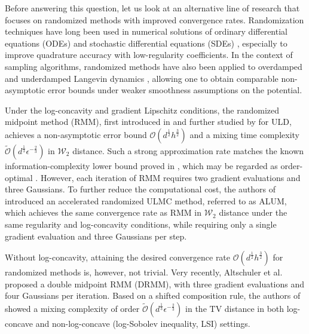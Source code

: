 \documentclass[12pt]{article}
\numberwithin{equation}{section}
\begin{document}
Before answering this question, let us look at an alternative line of research that focuses on randomized methods with improved convergence rates.
Randomization techniques have long been used in numerical solutions of ordinary differential equations (ODEs) \cite{heinrich2008randomized,jentzen2009random,stengle1995error} and stochastic differential equations (SDEs) \cite{kruse2017error,kruse2019randomized,bou2025randomized}, especially to improve quadrature accuracy with low-regularity coefficients. 
%
In the context of sampling algorithms, randomized methods have also been applied to overdamped and underdamped Langevin dynamics \cite{wang2025langevin,shen2019randomized,he2020ergodicity,yu2024langevin,altschuler2025shifted}, allowing one to obtain comparable non-asymptotic error bounds under weaker smoothness assumptions on the potential.

Under the log-concavity and gradient Lipschitz conditions, the randomized midpoint method (RMM), first introduced in \cite{shen2019randomized} and further studied by \cite{he2020ergodicity,yu2024langevin,altschuler2025shifted} for ULD, achieves a non-asymptotic error bound $\mathcal{O}(d^{\frac{1}{2}}h^{\frac{3}{2}})$ and a mixing time complexity $\widetilde{\mathcal{O}}(d^{\frac{1}{3}}\epsilon^{-\frac{2}{3}})$ in $\mathcal{W}_2$ distance. Such a strong approximation rate matches the known information-complexity lower bound proved in \cite{cao2020complexity}, which may be regarded as order-optimal \cite{cao2020complexity,sanz2021wasserstein,mou2021high}. However, each iteration of RMM requires two gradient evaluations and three Gaussians. 
To further reduce the computational cost, the authors of \cite{hu2021optimal} introduced an accelerated randomized ULMC method, referred to as ALUM, which achieves the same convergence rate as RMM in $\mathcal{W}_2$ distance under the same regularity and log-concavity conditions, while requiring only a single gradient evaluation and three Gaussians per step. 

Without log-concavity, attaining the desired convergence rate $\mathcal{O}(d^{\frac{1}{2}}h^{\frac{3}{2}})$ for randomized methods is, however, not trivial. %
Very recently, Altschuler et al. \cite{altschuler2025shifted} proposed a double midpoint RMM (DRMM), with three gradient evaluations and four Gaussians per iteration. Based on a shifted composition rule, the authors of \cite{altschuler2025shifted} showed a mixing complexity of order $\widetilde{\mathcal{O}}(d^{\frac{1}{3}}\epsilon^{-\frac{2}{3}})$ in the $\mathrm{TV}$ distance in both log-concave and non-log-concave  (log-Sobolev inequality, LSI) settings. 
\end{document}
